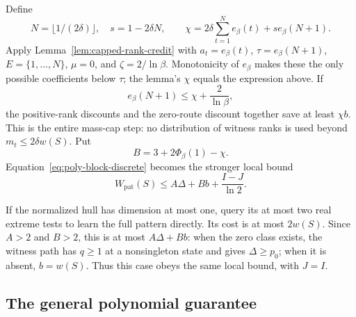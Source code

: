 Define
\[
 N=\lfloor1/(2\delta)\rfloor,\quad s=1-2\delta N,\qquad
 \chi=2\delta\sum_{t=1}^{N}e_\beta(t)+s e_\beta(N+1).
\]
Apply Lemma~\ref{lem:capped-rank-credit} with
$a_t=e_\beta(t)$, $\tau=e_\beta(N+1)$,
$E=\{1,\ldots,N\}$, $\mu=0$, and $\zeta=2/\ln\beta$.
Monotonicity of $e_\beta$ makes these the only possible coefficients
below $\tau$; the lemma's $\chi$ equals the expression above.
If
\begin{equation}\label{eq:poly-block-credit-condition}
 e_\beta(N+1)\le\chi+\frac2{\ln\beta},
\end{equation}
the positive-rank discounts and the zero-route discount together save
at least $\chi b$. This is the entire mass-cap step: no distribution
of witness ranks is used beyond $m_t\le2\delta w(S)$.
Put
\begin{equation}\label{eq:poly-block-B}
 B=3+2\Phi_\beta(1)-\chi.
\end{equation}
Equation~\eqref{eq:poly-block-discrete} becomes the stronger local bound
\begin{equation}\label{eq:poly-block-local}
 W_{\mathrm{pat}}(S)\le A\Delta+B b+\frac{I-J}{\ln2}.
\end{equation}

If the normalized hull has dimension at most one, query its at most
two real extreme tests to learn the full pattern directly. Its cost
is at most $2w(S)$. Since $A>2$ and $B>2$, this is at most
$A\Delta+B b$: when the zero class exists, the witness path has
$q\ge1$ at a nonsingleton state and gives $\Delta\ge p_0$;
when it is absent, $b=w(S)$. Thus this case obeys the same local bound,
with $J=I$.

\subsection{The general polynomial guarantee}

